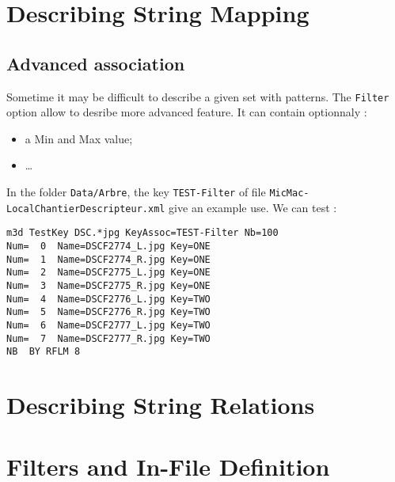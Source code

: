 \section{Describing String Mapping}

\label{Ref:Key:Map}


\subsection{Advanced association}

Sometime it may be difficult to describe a given set with patterns. The {\tt Filter}
option allow to desribe more advanced feature. It can contain optionnaly :

\begin{itemize}
    \item a Min and Max value;
    \item \dots
\end{itemize}

In the folder {\tt Data/Arbre}, the key {\tt TEST-Filter} of file {\tt MicMac-LocalChantierDescripteur.xml}
give an example use. We can test :

\begin{verbatim}
m3d TestKey DSC.*jpg KeyAssoc=TEST-Filter Nb=100 
Num=  0  Name=DSCF2774_L.jpg Key=ONE
Num=  1  Name=DSCF2774_R.jpg Key=ONE
Num=  2  Name=DSCF2775_L.jpg Key=ONE
Num=  3  Name=DSCF2775_R.jpg Key=ONE
Num=  4  Name=DSCF2776_L.jpg Key=TWO
Num=  5  Name=DSCF2776_R.jpg Key=TWO
Num=  6  Name=DSCF2777_L.jpg Key=TWO
Num=  7  Name=DSCF2777_R.jpg Key=TWO
NB  BY RFLM 8
\end{verbatim}


\section{Describing String Relations}


\section{Filters and In-File Definition}




